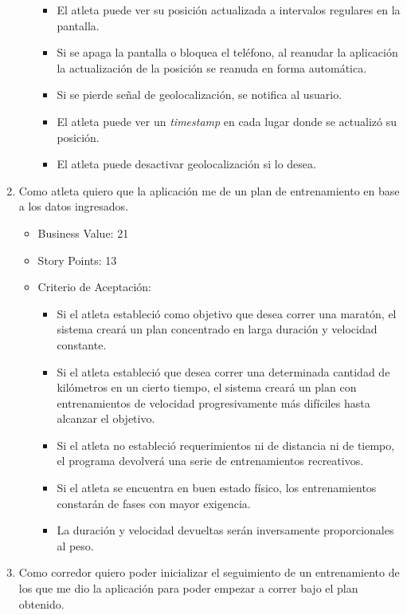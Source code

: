 \begin{enumerate}
\begin{itemize}
    \begin{itemize}
    \itemsep1pt\parskip0pt
    \item
      El atleta puede ver su posición actualizada a intervalos regulares
      en la pantalla.
    \item
      Si se apaga la pantalla o bloquea el teléfono, al reanudar la
      aplicación la actualización de la posición se reanuda en forma
      automática.
    \item
      Si se pierde señal de geolocalización, se notifica al usuario.
    \item
      El atleta puede ver un \emph{timestamp} en cada lugar donde se
      actualizó su posición.
    \item
      El atleta puede desactivar geolocalización si lo desea.
    \end{itemize}
  \end{itemize}
\item
  Como atleta quiero que la aplicación me de un plan de entrenamiento en
  base a los datos ingresados.

  \begin{itemize}
  \itemsep1pt\parskip0pt
  \item
    Business Value: 21
  \item
    Story Points: 13
  \item
    Criterio de Aceptación:

    \begin{itemize}
    \itemsep1pt\parskip0pt
    \item
      Si el atleta estableció como objetivo que desea correr una
      maratón, el sistema creará un plan concentrado en larga duración y
      velocidad constante.
    \item
      Si el atleta estableció que desea correr una determinada cantidad
      de kilómetros en un cierto tiempo, el sistema creará un plan con
      entrenamientos de velocidad progresivamente más difíciles hasta
      alcanzar el objetivo.
    \item
      Si el atleta no estableció requerimientos ni de distancia ni de
      tiempo, el programa devolverá una serie de entrenamientos
      recreativos.
    \item
      Si el atleta se encuentra en buen estado físico, los
      entrenamientos constarán de fases con mayor exigencia.
    \item
      La duración y velocidad devueltas serán inversamente
      proporcionales al peso.
    \end{itemize}
  \end{itemize}
\item
  Como corredor quiero poder inicializar el seguimiento de un
  entrenamiento de los que me dio la aplicación para poder empezar a
  correr bajo el plan obtenido.


\end{enumerate}

